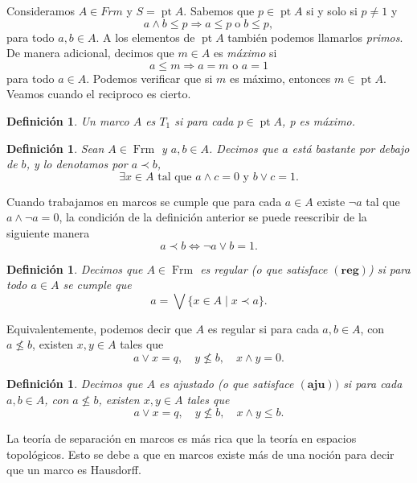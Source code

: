 \documentclass[12pt]{article}
\newtheorem{dfn}[thm]{Definición}
\DeclareMathOperator{\Frm}{Frm}
\DeclareMathOperator{\pt}{pt}
\begin{document}
Consideramos $A\in Frm$ y $S=\pt A$. Sabemos que $p\in \pt A$ si y solo si $p\neq 1$ y
\begin{equation}\label{primo}
a\wedge b\leq p \Rightarrow a\leq p \; \text{o}\; b\leq p,
\end{equation}
para todo $a, b\in A$. A los elementos de $\pt A$ también podemos llamarlos \emph{primos}.\\

De manera adicional, decimos que $m\in A$ es \emph{máximo} si 
\[
a\leq m\Rightarrow a=m \text{ o } a=1
\]
para todo $a\in A$. Podemos verificar que si $m$ es máximo, entonces $m\in \pt A$. Veamos cuando el reciproco es cierto.

\begin{dfn}\label{FrmT1}
Un marco $A$ es $T_1$ si para cada $p\in \pt A$, p es máximo.
\end{dfn}

\begin{dfn}\label{Bpordebajo}
Sean $A\in \Frm$ y $a, b\in A$. Decimos que $a$ está \emph{bastante por debajo} de $b$, y lo denotamos por $a\prec b$, 
\[
\exists x\in A\text{ tal que }a\wedge c=0 \text{ y }b\vee c=1.
\]
\end{dfn}

Cuando trabajamos en marcos se cumple que para cada $a\in A$ existe $\neg a$ tal que $a\wedge \neg a=0$, la condición de la definición anterior 
se puede reescribir de la siguiente manera
\[
a\prec b\iff \neg a\vee b=1.
\]

\begin{dfn}\label{reg}
Decimos que $A\in \Frm$ es \emph{regular} (o que satisface $\mathbf{(reg)}$) si para todo $a\in A$ se cumple que
\[
a=\bigvee\{x\in A\mid x\prec a\}.
\]
\end{dfn}

Equivalentemente, podemos decir que $A$ es regular si para cada $a, b\in A$, con $a\nleq b$, existen $x, y\in A$
tales que 
\[
a\vee x=q, \quad y\nleq b, \quad x\wedge y=0.
\]

\begin{dfn}\label{aju}
Decimos que $A$ es \emph{ajustado} (o que satisface $\mathbf{(aju)})$ si para cada $a, b\in A$, con $a\nleq b$, existen $x, y\in A$
tales que 
\[
a\vee x=q, \quad y\nleq b, \quad x\wedge y\leq b.
\]
\end{dfn}

La teoría de separación en marcos es más rica que la teoría en espacios topológicos. Esto se debe a que en marcos existe más de una noción para decir
que un marco es Hausdorff.
\end{document}
